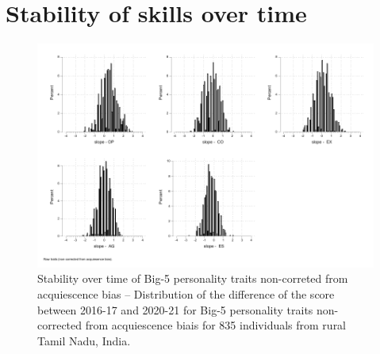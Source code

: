 \documentclass[a4paper, 11pt, onecolumn]{article}
\begin{document}
\section{Stability of skills over time}
\label{section:stab_big5}



\begin{figure}[!htb]
\raggedright
\includegraphics[scale=0.86]{INPUT/diffcont_raw}
\caption{Stability over time of Big-5 personality traits non-correted from acquiescence bias -- Distribution of the difference of the score between 2016-17 and 2020-21 for Big-5 personality traits non-corrected from acquiescence biais for 835 individuals from rural Tamil Nadu, India.}
\label{fig:stabraw}
\end{figure}
\end{document}
